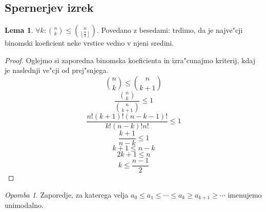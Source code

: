 \documentclass[a4paper,12pt]{article}
\theoremstyle{definition}
\newtheorem{lemma}[counter]{Lema}
\theoremstyle{remark}
\newtheorem*{rem}{Opomba}
\begin{document}
\subsection{Spernerjev izrek}
\begin{lemma}
	$\forall k: \binom{n}{k} \leqslant \binom{n}{\left\lfloor \frac{n}{2} \right\rfloor}$. 
	Povedano z besedami: trdimo, da je najve"cji binomski koeficient neke vrstice vedno v njeni sredini.
\end{lemma}
\begin{proof}
	Oglejmo si zaporedna binomska koeficienta in izra"cunajmo kriterij, kdaj je naslednji ve"cji od prej"snjega.
	\[ \binom{n}{k} \leqslant \binom{n}{k+1} \]
	\[ \frac{\binom{n}{k}}{\binom{n}{k+1}}\leqslant 1 \]
	\[ \frac{n!(k+1)!(n-k-1)!}{k!(n-k)!n!} \leqslant 1 \]
	\[ \frac{k+1}{n-k} \leqslant 1 \]
	\[ k+1 \leqslant n-k \]
	\[ 2k+1 \leqslant n \]
	\[ k \leqslant \frac{n-1}{2} \]
\end{proof}
\begin{rem}
	Zaporedje, za katerega velja $a_0 \leqslant a_1 \leqslant \cdots \leqslant a_k \geqslant a_{k+1} \geqslant \cdots$ imenujemo unimodalno.
\end{rem}
\end{document}
